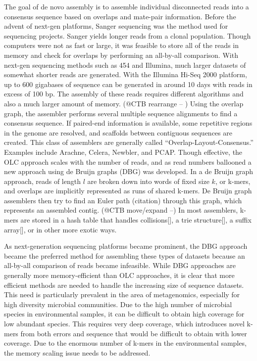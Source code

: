 \documentclass[12pt]{article} \usepackage{simplemargins}
\begin{document}
The goal of de novo assembly is to assemble individual disconnected
reads into a consensus sequence based on overlaps and mate-pair
information. Before the advent of next-gen platforms, Sanger
sequencing was the method used for sequencing projects.  Sanger yields
longer reads from a clonal population.  Though
computers were not as fast or large, it was feasible to
store all of the reads in memory and check for overlaps by performing
an all-by-all comparison\cite{assemblyreview}. With next-gen sequencing 
methods such as 454 and Illumina, much larger datasets of somewhat shorter reads 
are generated. With the Illumina Hi-Seq 2000 platform, up to 600 
gigabases of sequence can be generated 
in around 10 days with reads in excess of 100 bp. The assembly of 
these reads requires different
algorithms and also a much larger amount of memory.
(@CTB rearrange -- ) Using the overlap
graph, the assembler performs several multiple sequence alignments to
find a consensus sequence. If paired-end information is available,
some repetitive regions in the genome are resolved, and scaffolds
between contiguous sequences are created. This class of assemblers are
generally called “Overlap-Layout-Consensus.” Examples include
Arachne\cite{arachne}, Celera\cite{celera}, Newbler\cite{newbler}, 
and PCAP\cite{pcap}. Though effective, the OLC
approach scales with the number of reads, and as read numbers ballooned
a new approach using de Bruijn graphs (DBG) was developed\cite{pmid11504945}.
In a de Bruijn
graph approach, reads of length $l$ are broken down into words of fixed
size $k$, or k-mers, and overlaps are implicitly represented as runs of shared k-mers.
De Bruijn graph assemblers then try to find an Euler path (citation) through
this graph, which represents an assembled contig. (@CTB move/expand --) In most assemblers,
k-mers are stored in a hash table that handles collisions[], a trie
structure[], a suffix array[], or in other more exotic ways.

As next-generation sequencing platforms became prominent, the DBG approach
became the preferred method for assembling these types of datasets
because an all-by-all comparison of reads became infeasible. While DBG
approaches are generally more memory-efficient than OLC approaches, it
is clear that more efficient methods are needed to handle the
increasing size of sequence datasets. This need is particularly
prevalent in the area of metagenomics, especially for high diversity
microbial communities. Due to the high number of microbial species 
in environmental samples, it can be difficult to obtain high coverage 
for low abundant species. This 
requires very deep coverage, which introduces novel k-mers from both 
errors and sequence that 
would be difficult to obtain with lower coverage. Due to the enormous 
number of k-mers in the 
environmental samples, the memory scaling issue needs to be addressed.
\end{document}
